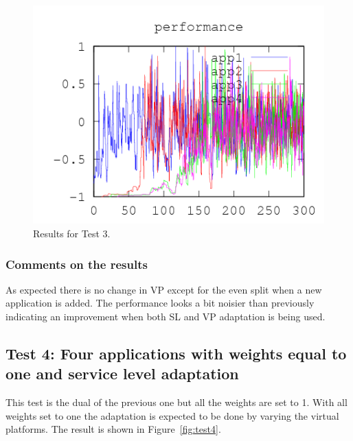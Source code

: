\documentclass[nobiblatex]{LTHthesis}
\begin{document}
\begin{figure}[th]
\begin{minipage}{0.49\textwidth}
  \includegraphics[width=\textwidth]{"tools/plot/logs/test3/f"}
  \end{minipage}
\caption{Results for Test 3.}
\label{fig:test3}
\end{figure}

\subsubsection{Comments on the results}
As expected there is no change in VP except for the even split when a new application is added. The performance looks a bit noisier than previously indicating an improvement when both SL and VP adaptation is being used.

\subsection{Test 4: Four applications with weights equal to one and 
  service level adaptation}

This test is the dual of the previous one but all the weights are set to 1.
With all weights set to one the adaptation is expected to be done by varying the virtual platforms. The result is shown in Figure~\ref{fig:test4}. 
\end{document}
